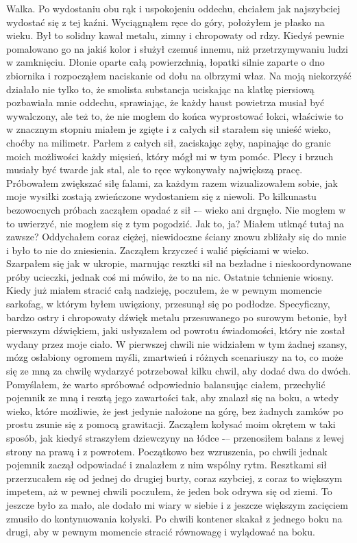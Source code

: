 Walka. Po wydostaniu obu rąk i uspokojeniu oddechu, chciałem jak najszybciej wydostać się z tej kaźni. Wyciągnąłem ręce do góry, położyłem je płasko na wieku. Był to solidny kawał metalu, zimny i chropowaty od rdzy. Kiedyś pewnie pomalowano go na jakiś kolor i służył czemuś innemu, niż przetrzymywaniu ludzi w zamknięciu. Dłonie oparte całą powierzchnią, łopatki silnie zaparte o dno zbiornika i rozpocząłem naciskanie od dołu na olbrzymi właz. Na moją niekorzyść działało nie tylko to, że smolista substancja uciskając na klatkę piersiową pozbawiała mnie oddechu, sprawiając, że każdy haust powietrza musiał być wywalczony, ale też to, że nie mogłem do końca wyprostować łokci, właściwie to w znacznym stopniu miałem je zgięte i z całych sił starałem się unieść wieko, choćby na milimetr. Parłem z całych sił, zaciskając zęby, napinając do granic moich możliwości każdy mięsień, który mógł mi w tym pomóc. Plecy i brzuch musiały być twarde jak stal, ale to ręce wykonywały największą pracę. Próbowałem zwiększać siłę falami, za każdym razem wizualizowałem sobie, jak moje wysiłki zostają zwieńczone wydostaniem się z niewoli. Po kilkunastu bezowocnych próbach zacząłem opadać z sił -– wieko ani drgnęło. Nie mogłem w to uwierzyć, nie mogłem się z tym pogodzić. Jak to, ja? Miałem utknąć tutaj na zawsze? Oddychałem coraz ciężej, niewidoczne ściany znowu zbliżały się do mnie i było to nie do zniesienia. Zacząłem krzyczeć i walić pięściami w wieko. Szarpałem się jak w ukropie, marnując resztki sił na bezładne i nieskoordynowane próby ucieczki, jednak coś mi mówiło, że to na nic. Ostatnie tchnienie wiosny. Kiedy już miałem stracić całą nadzieję, poczułem, że w pewnym momencie sarkofag, w którym byłem uwięziony, przesunął się po podłodze. Specyficzny, bardzo ostry i chropowaty dźwięk metalu przesuwanego po surowym betonie, był pierwszym dźwiękiem, jaki usłyszałem od powrotu świadomości, który nie został wydany przez moje ciało. W pierwszej chwili nie widziałem w tym żadnej szansy, mózg osłabiony ogromem myśli, zmartwień i różnych scenariuszy na to, co może się ze mną za chwilę wydarzyć potrzebował kilku chwil, aby dodać dwa do dwóch. Pomyślałem, że warto spróbować odpowiednio balansując ciałem, przechylić pojemnik ze mną i resztą jego zawartości tak, aby znalazł się na boku, a wtedy wieko, które możliwie, że jest jedynie nałożone na górę, bez żadnych zamków po prostu zsunie się z pomocą grawitacji. Zacząłem kołysać moim okrętem w taki sposób, jak kiedyś straszyłem dziewczyny na łódce -– przenosiłem balans z lewej strony na prawą i z powrotem. Początkowo bez wzruszenia, po chwili jednak pojemnik  zaczął odpowiadać i znalazłem z nim wspólny rytm. Resztkami sił przerzucałem się od jednej do drugiej burty, coraz szybciej, z coraz to większym impetem, aż w pewnej chwili poczułem, że jeden bok odrywa się od ziemi. To jeszcze było za mało, ale dodało mi wiary w siebie i z jeszcze większym zacięciem zmusiło do kontynuowania kołyski. Po chwili kontener skakał z jednego boku na drugi, aby w pewnym momencie stracić równowagę i wylądować na boku. 

